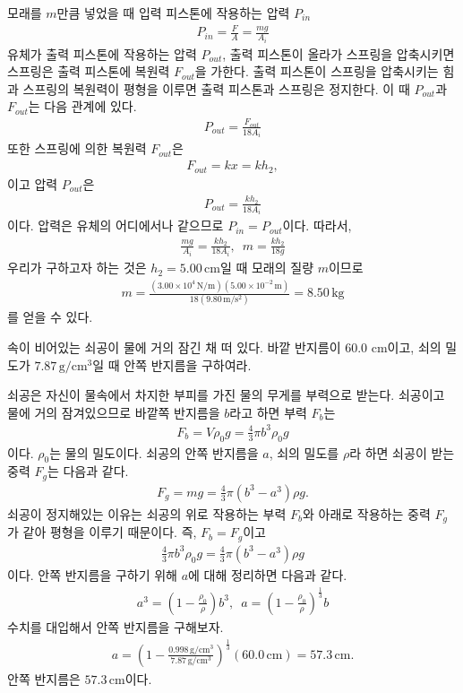 \documentclass[floatfix,nofootinbib,superscriptaddress,fleqn]{revtex4-2}
\begin{document}
모래를 $m$만큼 넣었을 때 입력 피스톤에 작용하는 압력 $P_{in}$
 \begin{align}
   P_{in} =\frac{F}{A} =\frac{mg}{A_i}
 \end{align}
 유체가 출력 피스톤에 작용하는 압력 $P_{out}$, 출력 피스톤이 올라가 
 스프링을 압축시키면 스프링은 출력 피스톤에 복원력 $F_{out}$을 가한다. 
 출력 피스톤이 스프링을 압축시키는 힘과
 스프링의 복원력이 평형을 이루면 출력 피스톤과 스프링은 정지한다. 
 이 때 $P_{out}$과 $F_{out}$는 다음 관계에 있다.
 \begin{align}
   P_{out} = \frac{F_{out}}{18A_i}
 \end{align}
 또한 스프링에 의한 복원력 $F_{out}$은
 \begin{align}
   F_{out} = kx = kh_2,
 \end{align}
 이고 압력 $P_{out}$은
 \begin{align}
  P_{out} = \frac{kh_2}{18A_i}
 \end{align}
 이다. 압력은 유체의 어디에서나 같으므로 $P_{in}=P_{out}$이다. 따라서,
 \begin{align}
  \frac{mg}{A_i} = \frac{kh_2}{18A_i},\,\,\,m=\frac{kh_2}{18g}
 \end{align}
 우리가 구하고자 하는 것은 $h_2 = 5.00\,\mathrm{cm}$일 때 
 모래의 질량 $m$이므로
 \begin{align}
   m = \frac{(3.00\times 10^4\,\mathrm{N/m})
   (5.00\times 10^{-2}\,\mathrm{m})}
   {18(9.80\,\mathrm{m/s^2})}
   =8.50\,\mathrm{kg}
 \end{align}
 를 얻을 수 있다.
\vspace{1.cm}


속이 비어있는 쇠공이 물에 거의 잠긴
채 떠 있다. 바깥 반지름이 60.0 cm이고, 쇠의 밀도가
$7.87\,\mathrm{g/cm^3}$일 때 안쪽 반지름을 구하여라.

쇠공은 자신이 물속에서 차지한 부피를 가진 물의 무게를 부력으로 받는다.
쇠공이고 물에 거의 잠겨있으므로 바깥쪽 반지름을 $b$라고 하면 
부력 $F_b$는
\begin{align}
  F_b = V\rho_0 g =\frac{4}{3}\pi b^3\rho_0 g
\end{align}
이다. $\rho_0$는 물의 밀도이다. 
쇠공의 안쪽 반지름을 $a$, 쇠의 밀도를 $\rho$라 하면 쇠공이 받는 중력 $F_g$는
다음과 같다.
\begin{align}
  F_g = mg = \frac{4}{3}\pi(b^3-a^3)\rho g.
\end{align}
쇠공이 정지해있는 이유는
쇠공의 위로 작용하는 부력 $F_b$와 아래로 작용하는 중력 $F_g$가 같아 
평형을 이루기 때문이다. 즉, $F_b = F_g$이고
\begin{align}
  \frac{4}{3}\pi b^3\rho_0 g = \frac{4}{3}\pi(b^3-a^3)\rho g
\end{align}
이다. 안쪽 반지름을 구하기 위해 $a$에 대해 정리하면 다음과 같다.
\begin{align}
  a^3 = \left(1-\frac{\rho_0}{\rho}\right)b^3,\,\,\,
  a = {\left(1-\frac{\rho_0}{\rho}\right)}^{\frac{1}{3}}b
\end{align}
수치를 대입해서 안쪽 반지름을 구해보자.
\begin{align}
  a = {\left(1-\frac{0.998\,\mathrm{g/cm^3}}
  {7.87\,\mathrm{g/cm^3}}\right)}^{\frac{1}{3}}
  (60.0\,\mathrm{cm})= 57.3\,\mathrm{cm}.
\end{align}
안쪽 반지름은 $57.3\,\mathrm{cm}$이다.
\end{document}
